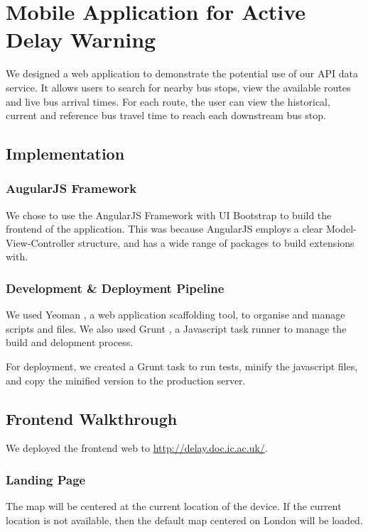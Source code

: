\chapter{Mobile Application for Active Delay Warning}
\label{ch:mobile_app}

\par We designed a web application to demonstrate the potential use of our API data service. It allows users to search for nearby bus stops, view the available routes and live bus arrival times. For each route, the user can view the historical, current and reference bus travel time to reach each downstream bus stop.

\section{Implementation}
\subsection{AugularJS Framework}
\par We chose to use the AngularJS Framework \cite{angularjs} with UI Bootstrap \cite{bootstrap} to build the frontend of the application. This was because AngularJS employs a clear Model-View-Controller structure, and has a wide range of packages to build extensions with.

\subsection{Development \& Deployment Pipeline}
\par We used Yeoman \cite{yeoman}, a web application scaffolding tool, to organise and manage scripts and files. We also used Grunt \cite{grunt}, a Javascript task runner to manage the build and delopment process.

\par For deployment, we created a Grunt task to run tests, minify the javascript files, and copy the minified version to the production server.

\section{Frontend Walkthrough}
\par We deployed the frontend web to \url{http://delay.doc.ic.ac.uk/}.

\subsection{Landing Page}
\par The map will be centered at the current location of the device. If the current location is not available, then the default map centered on London will be loaded.

